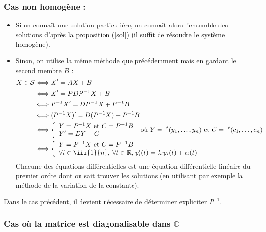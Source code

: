 \documentclass[french,11pt,twoside]{VcCours}
\begin{document}
\subsubsection*{Cas non homogène :} 
\begin{itemize}
\item Si on connaît une solution particulière, on connaît alors l'ensemble des solutions d'après la proposition (\ref{sol}) (il suffit de résoudre le système homogène).
\item Sinon, on utilise la même méthode que précédemment mais en gardant le second membre $B$ :
\begin{align*}
X \in \mathcal{S} & \Longleftrightarrow  X'=AX+B \\
& \Longleftrightarrow X'=PDP^{-1} X+B\\
& \Longleftrightarrow P^{-1}X'=DP^{-1}X + P^{-1}B\\
& \Longleftrightarrow (P^{-1}X)'=D(P^{-1}X) + P^{-1}B \\
& \Longleftrightarrow \left\lbrace \begin{array}{l}
Y=P^{-1}X \hbox{ et }  C=P^{-1}B\\
Y'=DY+C \\
\end{array}\right. \hbox{ où } Y= ~^t(y_1, \ldots, y_n) \hbox{ et } C= ~^t(c_1, \ldots, c_n)\\
& \Longleftrightarrow \left\lbrace \begin{array}{l}
Y=P^{-1}X \hbox{ et }  C=P^{-1}B\\
\forall i \in \iii{1}{n}, \; \forall t \in  \mathbb{R}, \, y_i'(t)=\lambda_i y_i(t) + c_i(t)  \\
\end{array}\right.
\end{align*}
Chacune des équations différentielles est une équation différentielle linéaire du premier ordre dont on sait trouver les solutions (en utilisant par exemple la méthode de la variation de la constante).
\end{itemize}

\begin{Remarque}{} Dans le cas précédent, il devient nécessaire de déterminer expliciter $P^{-1}$.
\end{Remarque}


\subsubsection*{Cas où la matrice est diagonalisable dans $\mathbb{C}$} 
\end{document}
